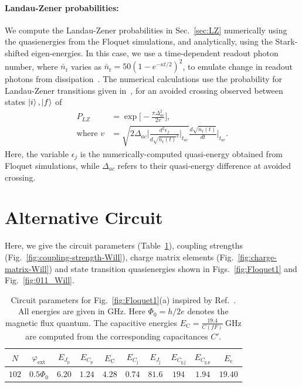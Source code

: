 \documentclass[%
reprint,
superscriptaddress,
 amsmath,amssymb,
 aps,
 prx,
longbibliography,
floatfix,
]{revtex4-2}
\begin{document}
{\paragraph{Landau-Zener probabilities:}\label{app:LZ}
We compute the Landau-Zener probabilities in Sec.~\ref{sec:LZ} numerically using the quasienergies from the Floquet simulations, and analytically, using the Stark-shifted eigen-energies. In this case, we use a time-dependent readout photon number, where $\bar n_\textrm{r}$ varies as $\bar n_\textrm{r}=50(1-e^{-\kappa t/2})^2$, to emulate change in readout photons from dissipation~\cite{dumas2024unifie,khezri2023measurement}. The numerical calculations use the probability for Landau-Zener transitions given in~\cite{ikeda2022floquet}, for an avoided crossing observed between states $\ket{i},\ket{f}$ of
\begin{align}
    P_{LZ}&=\exp{\Big[-\frac{\pi \Delta_{ac}^2}{2v}\Big]},\\
    \text{where } v&=\sqrt{2\Delta_{ac}\Big|\frac{d^2\epsilon_f}{d\sqrt{\bar{n}_\textrm{r}(t)}^2}\Big|_{t_{ac}}}\frac{d\sqrt{\bar{n}_\textrm{r}(t)}}{dt}|_{t_{ac}}\Big .
\end{align}
Here, the variable $\epsilon_j$ is the numerically-computed quasi-energy obtained from Floquet simulations, while $\Delta_{ac}$ refers to their quasi-energy difference at avoided crossing. 

\section{Alternative Circuit}\label{app:alt_circuit1}
Here, we give the circuit parameters (Table~\ref{tab:circuit_params_Will}), coupling strengths (Fig.~\ref{fig:coupling-strength-Will}), charge matrix elements (Fig.~\ref{fig:charge-matrix-Will}) and state transition quasienergies shown in Figs.~\ref{fig:Floquet1} and Fig.~\ref{fig:011_Will}. 
\begin{table}[htb]
\centering
\begin{tabular}{|c|c|c|c|c|c|c|c|c|c|}
    \hline
     $N$ & $\varphi_{\textrm{ext}}$ & $E_{J_\textrm{p}}$ & $E_{C_\textrm{p}}$ & $E_{\textrm{C}}$ & $E_{C_\textrm{j}}$ & $E_{J_\textrm{j}}$ & $E_{C_\textrm{g,j}}$ & $E_{C_\textrm{g,p}}$ & $E_{\textrm{c}}$ \\
    \hline
    $102$ & $0.5\Phi_0$ & $6.20$ & $1.24$ & $4.28$ & $0.74$ & $81.6$ & $194$ & $1.94$ & $19.40$ \\
    \hline
\end{tabular}
\caption{Circuit parameters for Fig.~\ref{fig:Floquet1}(a) inspired by Ref.~\cite{ding_high-fidelity_2023}. All energies are given in GHz. Here $\Phi_0=h/2e$ denotes the magnetic flux quantum. The capacitive energies $E_{\textrm{C}}=\frac{19.4}{{C}(fF)} \ \mathrm{GHz}$ are computed from the corresponding capacitances $C'$.}
\label{tab:circuit_params_Will}
\end{table}

}
\end{document}
